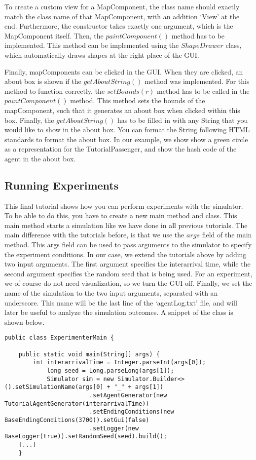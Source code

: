 \documentclass{article}
\begin{document}
To create a custom view for a MapComponent, the class name should exactly match the class name of that MapComponent, with an addition `View' at the end. Furthermore, the constructor takes exactly one argument, which is the MapComponent itself. Then, the $paintComponent()$ method has to be implemented. This method can be implemented using the $ShapeDrawer$ class, which automatically draws shapes at the right place of the GUI. 

Finally, mapComponents can be clicked in the GUI. When they are clicked, an about box is shown if the $getAboutString()$ method was implemented. For this method to function correctly, the $setBounds(r)$ method has to be called in the $paintComponent()$ method. This method sets the bounds of the mapComponent, such that it generates an about box when clicked within this box. Finally, the $getAboutString()$ has to be filled in with any String that you would like to show in the about box. You can format the String following HTML standards to format the about box. In our example, we show show a green circle as a representation for the TutorialPassenger, and show the hash code of the agent in the about box.

\subsection{Running Experiments} \label{sec:experiments}
This final tutorial shows how you can perform experiments with the simulator. To be able to do this, you have to create a new main method and class. This main method starts a simulation like we have done in all previous tutorials. The main difference with the tutorials before, is that we use the $args$ field of the main method. This args field can be used to pass arguments to the simulator to specify the experiment conditions. In our case, we extend the tutorials above by adding two input arguments. The first argument specifies the interarrival time, while the second argument specifies the random seed that is being used. For an experiment, we of course do not need visualization, so we turn the GUI off. Finally, we set the name of the simulation to the two input arguments, separated with an underscore. This name will be the last line of the `agentLog.txt' file, and will later be useful to analyze the simulation outcomes. A snippet of the class is shown below.

\begin{verbatim}
public class ExperimenterMain {

	public static void main(String[] args) {
	    int interarrivalTime = Integer.parseInt(args[0]);
		    long seed = Long.parseLong(args[1]);
		    Simulator sim = new Simulator.Builder<>().setSimulationName(args[0] + "_" + args[1])
			    	    .setAgentGenerator(new TutorialAgentGenerator(interarrivalTime))
				        .setEndingConditions(new BaseEndingConditions(3700)).setGui(false)
				        .setLogger(new BaseLogger(true)).setRandomSeed(seed).build();
    [...]
    }
\end{verbatim}
\end{document}
